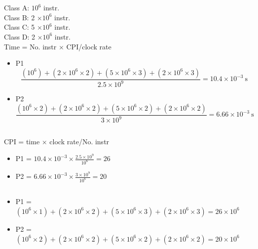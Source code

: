 \documentclass[11pt]{article}
\begin{document}
\section{}
\subsection{}
\begin{latin}
Class A: $10^6$ instr. \\
Class B: 2 $\times 10^6$ instr.\\
Class C: 5 $\times 10^6$ instr.\\
Class D: 2 $\times 10^6$ instr.\\
Time = No. instr $\times$ CPI/clock rate

\begin{itemize}
    \item P1 $$\frac{(10^6) + (2 \times 10^6 \times 2) + (5 \times 10^6 \times 3) + (2 \times 10^6 \times 3)}{2.5 \times 10^9} = 10.4 \times 10^{-3} \ \text{s}$$
    
    \item P2 $$\frac{(10^6 \times 2) + (2 \times 10^6 \times 2) + (5 \times 10^6 \times 2) + (2 \times 10^6 \times 2)}{3 \times 10^9} = 6.66 \times 10^{-3} \ \text{s}$$
\end{itemize}
\end{latin}

\subsection{}
\begin{latin}
CPI = time $\times$ clock rate/No. instr

\begin{itemize}
    \item P1 = $10.4 \times 10^{-3} \times \frac{2.5 \times 10^9}{10^6} = 26$
    \item P2 = $6.66 \times 10^{-3} \times \frac{3 \times 10^9}{10^6} = 20$
\end{itemize}
\end{latin}

\subsection{}
\begin{latin}

\begin{itemize}
\item P1 = $(10^6 \times 1) + (2 \times 10^6 \times 2) + (5 \times 10^6 \times 3) + (2 \times 10^6 \times 3) = 26 \times 10^6$

\item P2 = $(10^6 \times 2) + (2 \times 10^6 \times 2) + (5 \times 10^6 \times 2) + (2 \times 10^6 \times 2) = 20 \times 10^6$

\end{itemize}
\end{latin}
\end{document}
